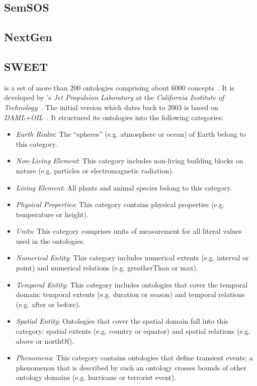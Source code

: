 \subsection{SemSOS}


\subsection{NextGen}


\subsection{SWEET}

 is a set of more than 200 ontologies comprising about 6000 concepts~\cite{SWEET2,SWEETWeb}. It is developed by 's \emph{Jet Propulsion Laboratory} at the \emph{California Institute of Technology}~\cite{nasa-jpl}. The initial version which dates back to 2003 is based on \emph{DAML+OIL}~\cite{DAML+OIL,SWEET1}. It structured its ontologies into the following categories:
\begin{itemize}
  \item \emph{Earth Realm}: The ``spheres'' (e.g. atmosphere or ocean) of Earth belong to this category.
  \item \emph{Non-Living Element}: This category includes non-living building blocks on nature (e.g. particles or electromagnetic radiation).
  \item \emph{Living Element}: All plants and animal species belong to this category.
  \item \emph{Physical Properties}: This category contains physical properties (e.g. temperature or height).
  \item \emph{Units}: This category comprises units of measurement for all literal values used in the ontologies.
  \item \emph{Numerical Entity}: This category includes numerical extents (e.g. interval or point) and numerical relations (e.g. greatherThan or max).
  \item \emph{Temporal Entity}: This category includes ontologies that cover the temporal domain: temporal extents (e.g. duration or season) and temporal relations (e.g. after or before).
  \item \emph{Spatial Entity}: Ontologies that cover the spatial domain fall into this category: spatial extents (e.g. country or equator) and spatial relations (e.g. above or northOf).
  \item \emph{Phenomena}: This category contains ontologies that define transient events; a phenomenon that is described by such an ontology crosses bounds of other ontology domains (e.g. hurricane or terrorist event).
\end{itemize}

